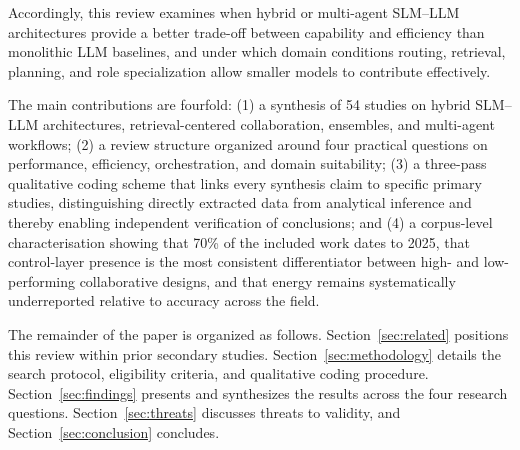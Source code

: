 Accordingly, this review examines when hybrid or multi-agent SLM--LLM architectures provide a better trade-off between capability and efficiency than monolithic LLM baselines, and under which domain conditions routing, retrieval, planning, and role specialization allow smaller models to contribute effectively.

The main contributions are fourfold: (1) a synthesis of 54 studies on hybrid SLM--LLM architectures, retrieval-centered collaboration, ensembles, and multi-agent workflows; (2) a review structure organized around four practical questions on performance, efficiency, orchestration, and domain suitability; (3) a three-pass qualitative coding scheme that links every synthesis claim to specific primary studies, distinguishing directly extracted data from analytical inference and thereby enabling independent verification of conclusions; and (4) a corpus-level characterisation showing that 70\% of the included work dates to 2025, that control-layer presence is the most consistent differentiator between high- and low-performing collaborative designs, and that energy remains systematically underreported relative to accuracy across the field.

The remainder of the paper is organized as follows. Section~\ref{sec:related} positions this review within prior secondary studies. Section~\ref{sec:methodology} details the search protocol, eligibility criteria, and qualitative coding procedure. Section~\ref{sec:findings} presents and synthesizes the results across the four research questions. Section~\ref{sec:threats} discusses threats to validity, and Section~\ref{sec:conclusion} concludes.
